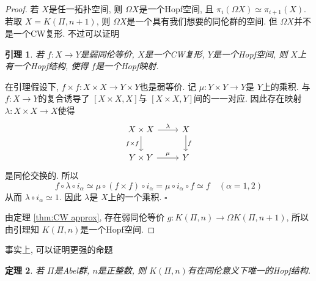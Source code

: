 \documentclass{ctexart}
\theoremstyle{plain}
\newtheorem{theorem}{定理}[section]
\newtheorem{lemma}[theorem]{引理}
\theoremstyle{definition}
\begin{document}
        \begin{proof}
            若 $X$是任一拓扑空间, 则 $\Omega X$是一个Hopf空间, 且 $\pi_{i}(\Omega X)\simeq \pi_{i+1}(X)$. 若取 $X=K(\Pi,n+1)$, 则 $\Omega X$是一个具有我们想要的同伦群的空间. 但 $\Omega X$并不是一个CW复形. 不过可以证明
            \begin{lemma}
                若 $f:X\to Y$是弱同伦等价, $X$是一个CW复形, $Y$是一个Hopf空间, 则 $X$上有一个Hopf结构, 使得 $f$是一个Hopf映射.
            \end{lemma}

            在引理假设下, $f\times f:X\times X\to Y\times Y$也是弱等价. 记 $\mu:Y\times Y\to Y$是 $Y$上的乘积. 与 $f:X\to Y$的复合诱导了 $[X\times X,X]$与 $[X\times X,Y]$间的一一对应. 因此存在映射 $\lambda:X\times X\to X$使得
            \begin{equation*}
                \begin{tikzcd}
                    X \times X \arrow[r, "\lambda"] \arrow[d, "f \times f"'] & X \arrow[d, "f"] \\
                    Y \times Y \arrow[r, "\mu"] & Y
                \end{tikzcd}
            \end{equation*}
            是同伦交换的. 所以
            \begin{equation*}
              f\circ \lambda\circ i_{\alpha}\simeq \mu\circ (f\times f)\circ i_{\alpha}=\mu\circ i_{\alpha}\circ f\simeq f \quad (\alpha=1,2)
            \end{equation*}
            从而 $\lambda\circ i_{\alpha}\simeq 1$. 因此 $\lambda$是 $X$上的一个乘积.
            \hfill{\(\square\)}

            由定理 \ref{thm:CW approx}, 存在弱同伦等价 $g:K(\Pi,n)\to \Omega K(\Pi,n+1)$, 所以由引理知 $K(\Pi,n)$是一个Hopf空间.
        \end{proof}

        事实上, 可以证明更强的命题
        \begin{theorem}
            若 $\Pi$是Abel群, $n$是正整数, 则 $K(\Pi,n)$有在同伦意义下唯一的Hopf结构.
        \end{theorem}
\end{document}
